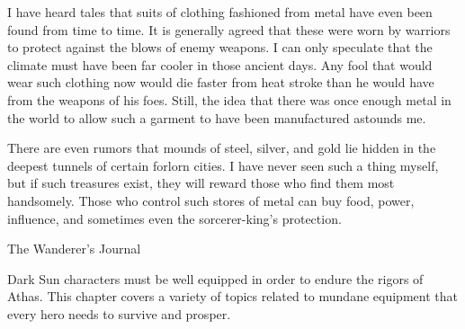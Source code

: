 {I have heard tales that suits of clothing fashioned from metal have even been found from time to time. It is generally agreed that these were worn by warriors to protect against the blows of enemy weapons. I can only speculate that the climate must have been far cooler in those ancient days. Any fool that would wear such clothing now would die faster from heat stroke than he would have from the weapons of his foes. Still, the idea that there was once enough metal in the world to allow such a garment to have been manufactured astounds me.

There are even rumors that mounds of steel, silver, and gold lie hidden in the deepest tunnels of certain forlorn cities. I have never seen such a thing myself, but if such treasures exist, they will reward those who find them most handsomely. Those who control such stores of metal can buy food, power, influence, and sometimes even the sorcerer-king's protection.}
{The Wanderer's Journal}

Dark Sun characters must be well equipped in order to endure the rigors of Athas. This chapter covers a variety of topics related to mundane equipment that every hero needs to survive and prosper.









